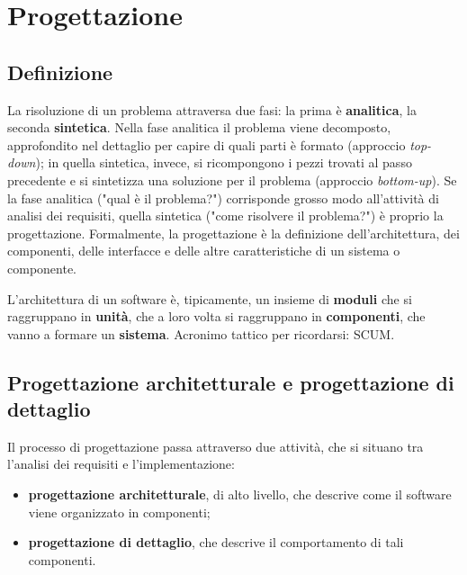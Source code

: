 \documentclass[a4paper]{article}
\begin{document}
	


		
	\section{Progettazione}


		
	\subsection{Definizione}

		
La risoluzione di un problema attraversa due fasi: la prima è \textbf{analitica}, la seconda \textbf{sintetica}. Nella fase analitica il problema viene decomposto, approfondito nel dettaglio per capire di quali parti è formato (approccio \emph{top-down}); in quella sintetica, invece, si ricompongono i pezzi trovati al passo precedente e si sintetizza una soluzione per il problema (approccio \emph{bottom-up}). Se la fase analitica ("qual è il problema?") corrisponde grosso modo all'attività di analisi dei requisiti, quella sintetica ("come risolvere il problema?") è proprio la progettazione. Formalmente, la progettazione è la definizione dell'architettura, dei componenti, delle interfacce e delle altre caratteristiche di un sistema o componente.
		
L'architettura di un software è, tipicamente, un insieme di \textbf{moduli} che si raggruppano in \textbf{unità}, che a loro volta si raggruppano in \textbf{componenti}, che vanno a formare un \textbf{sistema}. Acronimo tattico per ricordarsi: SCUM.

		
	\subsection{Progettazione architetturale e progettazione di dettaglio}

		
Il processo di progettazione passa attraverso due attività, che si situano tra l'analisi dei requisiti e l'implementazione:
		
	\begin{itemize}
		
			
	\item \textbf{progettazione architetturale}, di alto livello, che descrive come il software viene organizzato in componenti;
			
	\item \textbf{progettazione di dettaglio}, che descrive il comportamento di tali componenti.
		
	\end{itemize}
\end{document}
